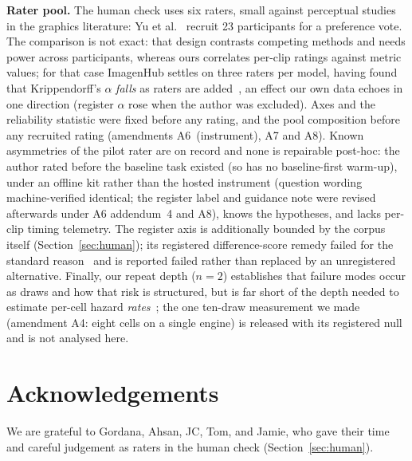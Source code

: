 \documentclass[11pt]{article}
\begin{document}
\textbf{Rater pool.} The human check uses six raters, small against
perceptual studies in the graphics literature: Yu et
al.~\cite{yu2024sketchbeaut} recruit 23 participants for a preference
vote. The comparison is not exact: that design contrasts competing methods
and needs power across participants, whereas ours correlates per-clip
ratings against metric values; for that case ImagenHub settles on three
raters per model, having found that Krippendorff's $\alpha$ \emph{falls} as
raters are added~\cite{ku2023imagenhub}, an effect our own data echoes in
one direction (register $\alpha$ rose when the author was excluded). Axes
and the reliability statistic were fixed before any rating, and the pool
composition before any recruited rating (amendments A6~(instrument), A7 and A8). Known
asymmetries of the pilot rater are on record and none is repairable
post-hoc: the author rated before the baseline task existed (so has no
baseline-first warm-up), under an offline kit rather than the hosted
instrument (question wording machine-verified identical; the register label
and guidance note were revised afterwards under A6 addendum~4 and A8), knows
the hypotheses,
and lacks per-clip timing telemetry. The register axis is additionally
bounded by the corpus itself (Section~\ref{sec:human}); its registered
difference-score remedy failed for the standard
reason~\cite{cronbach1970change} and is reported failed rather than
replaced by an unregistered alternative. Finally, our repeat
depth ($n=2$) establishes that failure modes occur as draws and how that risk
is structured, but is far short of the depth needed to estimate per-cell
hazard \emph{rates}~\cite{broadwater2026reliability}; the one ten-draw
measurement we made (amendment A4: eight cells on a single engine) is released
with its registered null and is not analysed here.

\section*{Acknowledgements}
We are grateful to Gordana, Ahsan, JC, Tom, and Jamie, who gave their time
and careful judgement as raters in the human check
(Section~\ref{sec:human}).
\end{document}
